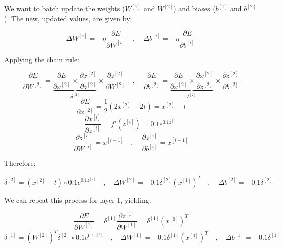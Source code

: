 \documentclass[12pt]{article}
\begin{document}
\begin{enumerate}[leftmargin=\labelsep]
          We want to batch update the weights ($W^{[1]}$ and $W^{[2]}$) and biases
          ($b^{[1]}$ and $b^{[2]}$). The new, updated values, are given by:

          $$
              \Delta W^{[i]} = - \eta \frac{\partial E}{\partial W^{[i]}}
              \quad,\quad
              \Delta b^{[i]} = - \eta \frac{\partial E}{\partial b^{[i]}}
          $$

          Applying the chain rule:

          $$
              \frac{\partial E}{\partial W^{[2]}} =
              \underbrace{\frac{\partial E}{\partial x^{[2]}}
                  \times
                  \frac{\partial x^{[2]}}{\partial z^{[2]}}
              }_{\delta^{[2]}}
              \times
              \frac{\partial z^{[2]}}{\partial W^{[2]}}
              \quad,\quad
              \frac{\partial E}{\partial b^{[2]}} =
              \underbrace{\frac{\partial E}{\partial x^{[2]}}
                  \times
                  \frac{\partial x^{[2]}}{\partial z^{[2]}}
              }_{\delta^{[2]}}
              \times
              \frac{\partial z^{[2]}}{\partial b^{[2]}}
          $$
          $$
              \frac{\partial E}{\partial x^{[2]}}
              = \frac{1}{2} \left( 2x^{[2]} - 2t \right)
              = x^{[2]} - t
          $$
          $$
              \frac{\partial x^{[i]}}{\partial z^{[i]}} = f'\left(z^{[i]}\right) = 0.1 e^{0.1 z^{[i]}}
          $$
          $$
              \frac{\partial z^{[i]}}{\partial W^{[i]}} = x^{[i-1]}
              \quad,\quad
              \frac{\partial z^{[i]}}{\partial b^{[i]}} = x^{[i-1]}
          $$

          Therefore:

          \begin{equation}\label{ex3-vars-layer-2}
              \delta^{[2]} = (x^{[2]} - t) \circ 0.1 e^{0.1 z^{[2]}}
              \quad,\quad
              \Delta W^{[2]} = - 0.1 \delta^{[2]} \left(x^{[1]}\right)^T
              \quad,\quad
              \Delta b^{[2]} = - 0.1 \delta^{[2]}
          \end{equation}

          We can repeat this process for layer 1, yielding:

          $$
              \frac{\partial E}{\partial W^{[1]}} = \delta^{[1]} \frac{\partial z^{[1]}}{\partial W^{[1]}}
              = \delta^{[1]} \left(x^{[0]}\right)^T
          $$
          \begin{equation}\label{ex3-vars-layer-1}
              \delta^{[1]} = \left(W^{[2]}\right)^T \delta^{[2]} \circ 0.1 e^{0.1 z^{[1]}}
              \quad,\quad
              \Delta W^{[1]} = - 0.1 \delta^{[1]} \left(x^{[0]}\right)^T
              \quad,\quad
              \Delta b^{[1]} = - 0.1 \delta^{[1]}
          \end{equation}


\end{enumerate}
\end{document}
